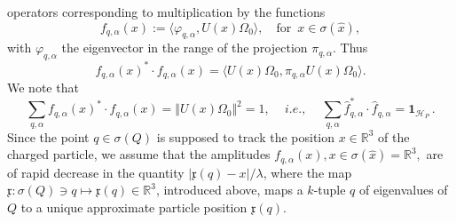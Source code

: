 \documentclass[12pt]{article}
\begin{document}
operators corresponding to multiplication by the functions
\begin{equation}\label{amplitude}
{f}_{q,\alpha}(x):= \langle \varphi_{q, \alpha}, U(x) \Omega_{0}\rangle, \quad \text{for }\,x\in \sigma(\hat{x}),
\end{equation}
with $\varphi_{q, \alpha}$ the eigenvector in the range of the projection $\pi_{q,\alpha}$. Thus
$$
{f}_{q, \alpha}(x)^{*}\cdot {f}_{q, \alpha}(x) = \langle U(x) \Omega_{0}, \pi_{q, \alpha} U(x) \Omega_{0}\rangle.
$$
We note that 
\begin{equation}\label{sumrule}
\sum_{q, \alpha} {f}_{q, \alpha}(x)^{*}\cdot {f}_{q, \alpha}(x) = \Vert U(x)\Omega_{0}\Vert^{2}= 1,\,\quad i.e., \quad \,
\sum_{q, \alpha} \widehat{f}_{q, \alpha}^{*} \cdot \widehat{f}_{q, \alpha} = \mathbf{1}_{\mathcal{H}_P}\,.
\end{equation}
Since the point $q\in \sigma(Q)$ is supposed to track the position $x\in \mathbb{R}^{3}$ of the charged particle, 
we assume that the amplitudes $f_{q, \alpha}(x), x\in \sigma(\hat{x}) = \mathbb{R}^{3},$ are of rapid decrease 
in the quantity $\vert \mathfrak{x}(q)-x \vert/\lambda$, where the map 
$\mathfrak{x}: \sigma(Q)\ni q \mapsto \mathfrak{x}(q) \in \mathbb{R}^{3}$, introduced above, 
maps a $k$-tuple $q$ of eigenvalues of $Q$ to a unique approximate particle position $\mathfrak{x}(q)$.
\end{document}
